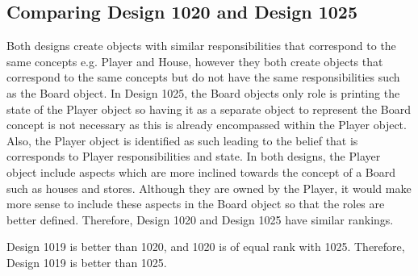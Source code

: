 \documentclass[conference]{IEEEtran}
\begin{document}
\subsection{Comparing Design 1020 and Design 1025}
Both designs create objects with similar responsibilities that correspond to the same concepts e.g. Player and House, however they both create objects that correspond to the same concepts but do not have the same responsibilities such as the Board object. In Design 1025, the Board objects only role is printing the state of the Player object so having it as a separate object to represent the Board concept is not necessary as this is already encompassed within the Player object. Also, the Player object is identified as such leading to the belief that is corresponds to Player responsibilities and state. In both designs, the Player object include aspects which are more inclined towards the concept of a Board such as houses and stores. Although they are owned by the Player, it would make more sense to include these aspects in the Board object so that the roles are better defined. Therefore, Design 1020 and Design 1025 have similar rankings.

Design 1019 is better than 1020, and 1020 is of equal rank with 1025. Therefore, Design 1019 is better than 1025.
\end{document}
